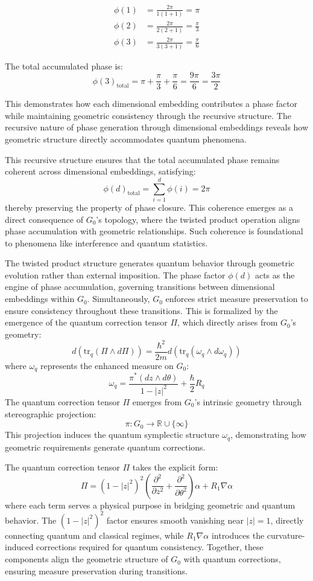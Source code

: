 \documentclass[10pt]{article}
\begin{document}
\[\begin{aligned}
\phi(1) &= \frac{2\pi}{1(1+1)} = \pi \\
\phi(2) &= \frac{2\pi}{2(2+1)} = \frac{\pi}{3} \\
\phi(3) &= \frac{2\pi}{3(3+1)} = \frac{\pi}{6}
\end{aligned}\]

The total accumulated phase is:
\[\phi(3)_{\text{total}} = \pi + \frac{\pi}{3} + \frac{\pi}{6} = \frac{9\pi}{6} = \frac{3\pi}{2}\]

This demonstrates how each dimensional embedding contributes a phase factor while maintaining geometric consistency through the recursive structure. The recursive nature of phase generation through dimensional embeddings reveals how geometric structure directly accommodates quantum phenomena.

This recursive structure ensures that the total accumulated phase remains coherent across dimensional embeddings, satisfying:
\[
\phi(d)_{\text{total}} = \sum_{i=1}^d \phi(i) = 2\pi
\]
thereby preserving the property of phase closure. This coherence emerges as a direct consequence of $G_0$'s topology, where the twisted product operation aligns phase accumulation with geometric relationships. Such coherence is foundational to phenomena like interference and quantum statistics.

The twisted product structure generates quantum behavior through geometric evolution rather than external imposition. The phase factor $\phi(d)$ acts as the engine of phase accumulation, governing transitions between dimensional embeddings within $G_0$. Simultaneously, $G_0$ enforces strict measure preservation to ensure consistency throughout these transitions. This is formalized by the emergence of the quantum correction tensor $\Pi$, which directly arises from $G_0$'s geometry:
\[
d(\text{tr}_q(\Pi \wedge d\Pi)) = \frac{\hbar^2}{2m}d(\text{tr}_q(\omega_q \wedge d\omega_q))
\]
where $\omega_q$ represents the enhanced measure on $G_0$:
\[
\omega_q = \frac{\pi^*(dz \wedge d\theta)}{1 - |z|^2} + \frac{\hbar}{2}R_q
\]
The quantum correction tensor $\Pi$ emerges from $G_0$'s intrinsic geometry through stereographic projection:
\[
\pi: G_0 \to \mathbb{R} \cup \{\infty\}
\]
This projection induces the quantum symplectic structure $\omega_q$, demonstrating how geometric requirements generate quantum corrections.

The quantum correction tensor $\Pi$ takes the explicit form:
\[
\Pi = (1-|z|^2)^2\left(\frac{\partial^2}{\partial z^2} + \frac{\partial^2}{\partial \theta^2}\right)\alpha + R_1\nabla\alpha
\]
where each term serves a physical purpose in bridging geometric and quantum behavior. The $(1-|z|^2)^2$ factor ensures smooth vanishing near $|z| = 1$, directly connecting quantum and classical regimes, while $R_1\nabla\alpha$ introduces the curvature-induced corrections required for quantum consistency. Together, these components align the geometric structure of $G_0$ with quantum corrections, ensuring measure preservation during transitions.
\end{document}
